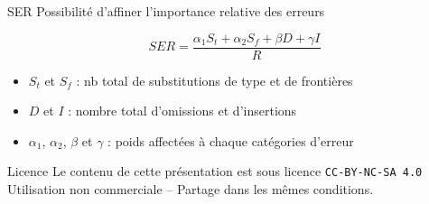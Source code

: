 \documentclass[xetex,xcolor={table,usenames,dvipsnames}]{beamer}
\begin{document}
\begin{frame}{\textsc{SER}}
	Possibilité d'affiner l'importance relative des erreurs
	
	\begin{equation*}
		SER = \dfrac{\alpha_1S_t + \alpha_2S_f + \beta D + \gamma I}{R}
	\end{equation*}
	
	\begin{itemize}
		\item $S_t$ et $S_f$ : nb total de substitutions de type et de frontières
		\item $D$ et $I$ : nombre total d'omissions et d'insertions
		\item $\alpha_1$, $\alpha_2$, $\beta$ et $\gamma$ : poids affectées à chaque catégories d'erreur
	\end{itemize}
\end{frame}

\begin{frame}[allowframebreaks]
		\printbibliography
\end{frame}




\begin{frame}{Licence}
	\centering
	{\small Le contenu de cette présentation est sous licence \texttt{CC-BY-NC-SA 4.0}\\Utilisation non commerciale -- Partage dans les mêmes conditions.\\}
	\href{https://creativecommons.org/licenses/by-nc-sa/4.0/deed.fr}{\ccbyncsa}
\end{frame}
\end{document}
